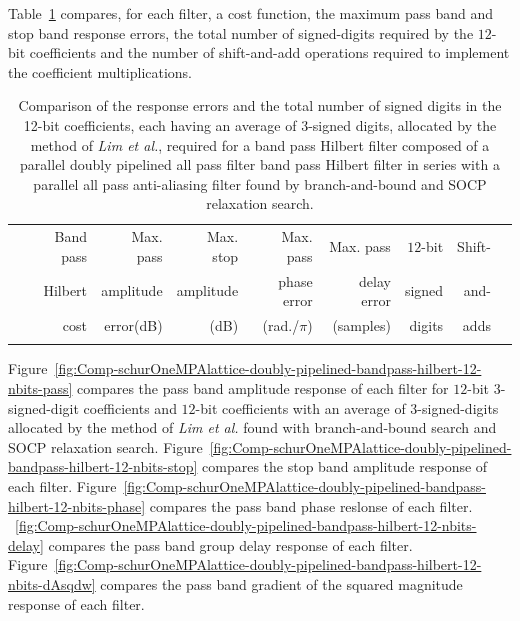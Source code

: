 \documentclass[a4paper,twoside,10pt,english]{article}
\begin{document}
Table~\ref{tab:Comp-schurOneMPAlattice-doubly-pipelined-bandpass-hilbert-12-nbits-cost}
compares, for each filter, a cost function, the maximum pass band and stop band
response errors, the total number of signed-digits required by the $12$-bit 
coefficients and the number of shift-and-add operations required to implement
the coefficient multiplications.

\begin{table}
\centering
\begin{threeparttable}
\begin{tabular}{lrrrrrrrr} \\ \toprule
&Band pass&Max. pass&Max. stop&Max. pass   &Max. pass  &$12$-bit&Shift-\\
&Hilbert  &amplitude&amplitude&phase error &delay error&signed  &and- \\
&cost     &error(dB)&(dB)     &(rad./$\pi$)&(samples)  &digits  &adds \\
\midrule

\\ \bottomrule
\end{tabular}
\end{threeparttable}
\caption[Comparison of parallel all pass doubly pipelined band pass Hilbert filter fixed point implementations]
{Comparison of the response errors and the total number of signed digits in the
  12-bit coefficients, each having an average of 3-signed digits, allocated by
  the method of \emph{Lim et al.}, required for a band pass Hilbert filter
  composed of a parallel doubly pipelined all pass filter band pass Hilbert
  filter in series with a parallel all pass anti-aliasing filter found by
  branch-and-bound and SOCP relaxation search.}
\label{tab:Comp-schurOneMPAlattice-doubly-pipelined-bandpass-hilbert-12-nbits-cost}
\end{table}

Figure~\ref{fig:Comp-schurOneMPAlattice-doubly-pipelined-bandpass-hilbert-12-nbits-pass}
compares the pass band amplitude response of each filter for
$12$-bit $3$-signed-digit coefficients and $12$-bit coefficients with an
average of $3$-signed-digits allocated by the method of \emph{Lim et al.}
found with branch-and-bound search and SOCP relaxation search.
Figure~\ref{fig:Comp-schurOneMPAlattice-doubly-pipelined-bandpass-hilbert-12-nbits-stop}
compares the stop band amplitude response of each filter.
Figure~\ref{fig:Comp-schurOneMPAlattice-doubly-pipelined-bandpass-hilbert-12-nbits-phase}
compares the pass band phase reslonse of each filter.
~\ref{fig:Comp-schurOneMPAlattice-doubly-pipelined-bandpass-hilbert-12-nbits-delay}
compares the pass band group delay response of each filter.
Figure~\ref{fig:Comp-schurOneMPAlattice-doubly-pipelined-bandpass-hilbert-12-nbits-dAsqdw}
compares the pass band gradient of the squared magnitude response of each
filter.
\end{document}
